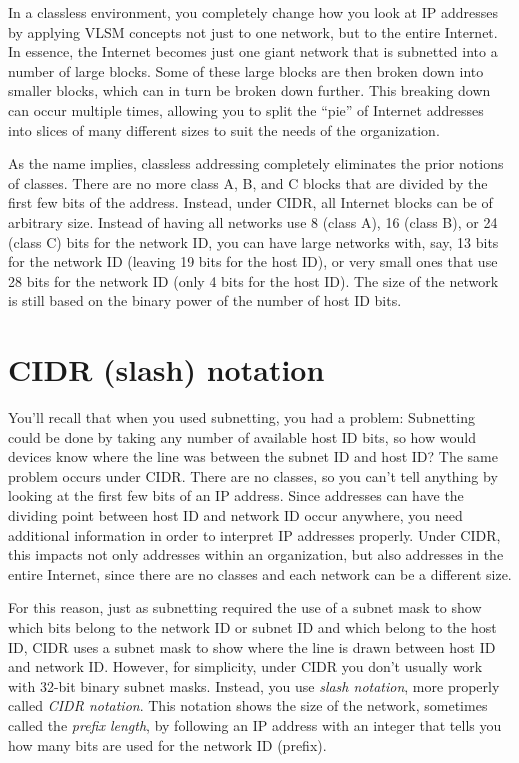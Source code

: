 In a classless environment, you completely change how you look at IP
addresses by applying VLSM concepts not just to one network, but to the
entire Internet. In essence, the Internet becomes just one giant network
that is subnetted into a number of large blocks. Some of these large
blocks are then broken down into smaller blocks, which can in turn be
broken down further. This breaking down can occur multiple times,
allowing you to split the ``pie'' of Internet addresses into slices of
many different sizes to suit the needs of the organization.

As the name implies, classless addressing completely eliminates the
prior notions of classes. There are no more class A, B, and C blocks
that are divided by the first few bits of the address.
Instead, under CIDR, all Internet blocks can be of arbitrary size. Instead of having all networks use 8 (class A), 16 (class B),
or 24 (class C) bits for the network ID, you can have large networks with, say, 13 bits for the network ID
(leaving 19 bits for the host ID), or very small ones that use 28 bits
for the network ID (only 4 bits for the host ID). The size of the
network is still based on the binary power of the number of host ID
bits.

\section{CIDR (slash) notation}

You'll recall that when you used subnetting, you had a problem: Subnetting
could be done by taking any number of available host ID bits, so how
would devices know where the line was between the subnet ID and host ID?
The same problem occurs under CIDR. There are no classes, so you can't
tell anything by looking at the first few bits of an IP address. Since
addresses can have the dividing point between host ID and network ID
occur anywhere, you need additional information in order to interpret IP
addresses properly. Under CIDR, this impacts not only addresses within
an organization, but also addresses in the entire Internet, since there
are no classes and each network can be a different size.

For this reason, just as subnetting required the use of a subnet mask to
show which bits belong to the network ID or subnet ID and which belong
to the host ID, CIDR uses a subnet mask to show where the line is drawn
between host ID and network ID. However, for simplicity, under CIDR you
don't usually work with 32-bit binary subnet masks. Instead, you use
\emph{slash notation}, more properly called \emph{CIDR notation}.
This notation shows the size of the network, sometimes called the \emph{prefix length}, by following an IP address with an integer that tells you how
many bits are used for the network ID (prefix).


